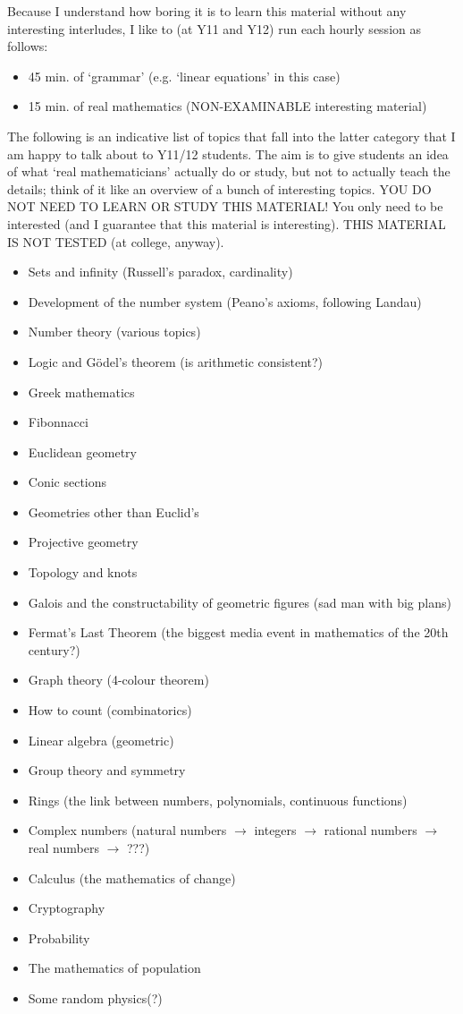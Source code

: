 \documentclass[a4paper]{amsart}
\theoremstyle{definition}
\theoremstyle{remark}
\begin{document}
  Because I understand how boring it is to learn this material without any interesting interludes, I like to (at Y11 and Y12)
  run each hourly session as follows:
  \begin{itemize}
    \item 45 min. of `grammar' (e.g. `linear equations' in this case)
    \item 15 min. of real mathematics (NON-EXAMINABLE interesting material)
  \end{itemize}
  The following is an indicative list of topics that fall into the latter category that I am happy to talk about to Y11/12
  students. The aim is to give students an idea of what `real mathematicians' actually do or study, but not to actually teach
  the details; think of it like an overview of a bunch of interesting topics. YOU DO NOT NEED TO LEARN OR STUDY THIS MATERIAL!
  You only need to be interested (and I guarantee that this material is interesting). THIS MATERIAL IS NOT TESTED (at college, anyway).

  \begin{itemize}
    \item Sets and infinity (Russell's paradox, cardinality)
    \item Development of the number system (Peano's axioms, following Landau)
    \item Number theory (various topics)
    \item Logic and G\"odel's theorem (is arithmetic consistent?)
    \item Greek mathematics
    \item Fibonnacci
    \item Euclidean geometry
    \item Conic sections
    \item Geometries other than Euclid's
    \item Projective geometry
    \item Topology and knots
    \item Galois and the constructability of geometric figures (sad man with big plans)
    \item Fermat's Last Theorem (the biggest media event in mathematics of the 20th century?)
    \item Graph theory (4-colour theorem)
    \item How to count (combinatorics)
    \item Linear algebra (geometric)
    \item Group theory and symmetry
    \item Rings (the link between numbers, polynomials, continuous functions)
    \item Complex numbers (natural numbers $\rightarrow$ integers $\rightarrow$ rational numbers $\rightarrow$ real numbers $\rightarrow$ ???)
    \item Calculus (the mathematics of change)
    \item Cryptography
    \item Probability
    \item The mathematics of population
    \item Some random physics(?)
  \end{itemize}
\end{document}
